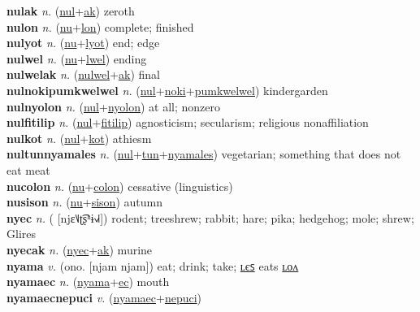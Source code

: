 \textbf{nulak} \textit{n.} (\hyperref[nul]{nul}+\hyperref[ak]{ak})
zeroth \label{nulak} \\
\textbf{nulon} \textit{n.} (\hyperref[nu]{nu}+\hyperref[lon]{lon})
complete; finished \label{nulon} \\
\textbf{nulyot} \textit{n.} (\hyperref[nu]{nu}+\hyperref[lyot]{lyot})
end; edge \label{nulyot} \\
\textbf{nulwel} \textit{n.} (\hyperref[nu]{nu}+\hyperref[lwel]{lwel})
ending \label{nulwel} \\
\textbf{nulwelak} \textit{n.} (\hyperref[nulwel]{nulwel}+\hyperref[ak]{ak})
final \label{nulwelak} \\
\textbf{nulnokipumkwelwel} \textit{n.} (\hyperref[nul]{nul}+\hyperref[noki]{noki}+\hyperref[pumkwelwel]{pumkwelwel})
kindergarden \label{nulnokipumkwelwel} \\
\textbf{nulnyolon} \textit{n.} (\hyperref[nul]{nul}+\hyperref[nyolon]{nyolon})
at all; nonzero \label{nulnyolon} \\
\textbf{nulfitilip} \textit{n.} (\hyperref[nul]{nul}+\hyperref[fitilip]{fitilip})
agnosticism; secularism; religious nonaffiliation \label{nulfitilip} \\
\textbf{nulkot} \textit{n.} (\hyperref[nul]{nul}+\hyperref[kot]{kot})
athiesm \label{nulkot} \\
\textbf{nultunnyamales} \textit{n.} (\hyperref[nul]{nul}+\hyperref[tun]{tun}+\hyperref[nyamales]{nyamales})
vegetarian; something that does not eat meat \label{nultunnyamales} \\
\textbf{nucolon} \textit{n.} (\hyperref[nu]{nu}+\hyperref[colon]{colon})
cessative (linguistics) \label{nucolon} \\
\textbf{nusison} \textit{n.} (\hyperref[nu]{nu}+\hyperref[sison]{sison})
autumn \label{nusison} \\
\textbf{nyec} \textit{n.} ( [njɛ˥˩ʈ͡ʂʰɨ˧˩˧])
rodent; treeshrew; rabbit; hare; pika; hedgehog; mole; shrew; Glires \label{nyec} \\
\textbf{nyecak} \textit{n.} (\hyperref[nyec]{nyec}+\hyperref[ak]{ak})
murine \label{nyecak} \\
\textbf{nyama} \textit{v.} (ono. [njam njam])
eat; drink; take; \hyperref[nyamales]{ʟєꜱ} eats \hyperref[nyamalon]{ʟᴏᴧ} \label{nyama} \\
\textbf{nyamaec} \textit{n.} (\hyperref[nyama]{nyama}+\hyperref[ec]{ec})
mouth \label{nyamaec} \\
\textbf{nyamaecnepuci} \textit{v.} (\hyperref[nyamaec]{nyamaec}+\hyperref[nepuci]{nepuci})
